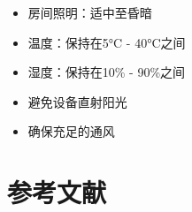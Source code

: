 \documentclass[
  Letterpaper,
]{scrbook}
\providecommand{\tightlist}{%
  \setlength{\itemsep}{0pt}\setlength{\parskip}{0pt}}\usepackage{longtable,booktabs,array}
\begin{document}
\begin{itemize}
\tightlist
\item
  房间照明：适中至昏暗
\item
  温度：保持在5°C - 40°C之间
\item
  湿度：保持在10\% - 90\%之间
\item
  避免设备直射阳光
\item
  确保充足的通风
\end{itemize}


\chapter*{参考文献}\label{ux53c2ux8003ux6587ux732e}

\end{document}
